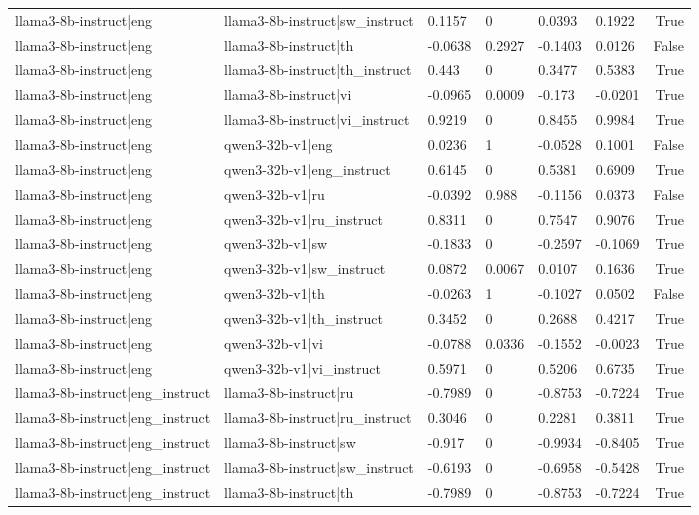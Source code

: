 \begin{table}
\begin{tabular}{llllllr}
llama3-8b-instruct|eng & llama3-8b-instruct|sw_instruct & 0.1157 & 0 & 0.0393 & 0.1922 & True \\
llama3-8b-instruct|eng & llama3-8b-instruct|th & -0.0638 & 0.2927 & -0.1403 & 0.0126 & False \\
llama3-8b-instruct|eng & llama3-8b-instruct|th_instruct & 0.443 & 0 & 0.3477 & 0.5383 & True \\
llama3-8b-instruct|eng & llama3-8b-instruct|vi & -0.0965 & 0.0009 & -0.173 & -0.0201 & True \\
llama3-8b-instruct|eng & llama3-8b-instruct|vi_instruct & 0.9219 & 0 & 0.8455 & 0.9984 & True \\
llama3-8b-instruct|eng & qwen3-32b-v1|eng & 0.0236 & 1 & -0.0528 & 0.1001 & False \\
llama3-8b-instruct|eng & qwen3-32b-v1|eng_instruct & 0.6145 & 0 & 0.5381 & 0.6909 & True \\
llama3-8b-instruct|eng & qwen3-32b-v1|ru & -0.0392 & 0.988 & -0.1156 & 0.0373 & False \\
llama3-8b-instruct|eng & qwen3-32b-v1|ru_instruct & 0.8311 & 0 & 0.7547 & 0.9076 & True \\
llama3-8b-instruct|eng & qwen3-32b-v1|sw & -0.1833 & 0 & -0.2597 & -0.1069 & True \\
llama3-8b-instruct|eng & qwen3-32b-v1|sw_instruct & 0.0872 & 0.0067 & 0.0107 & 0.1636 & True \\
llama3-8b-instruct|eng & qwen3-32b-v1|th & -0.0263 & 1 & -0.1027 & 0.0502 & False \\
llama3-8b-instruct|eng & qwen3-32b-v1|th_instruct & 0.3452 & 0 & 0.2688 & 0.4217 & True \\
llama3-8b-instruct|eng & qwen3-32b-v1|vi & -0.0788 & 0.0336 & -0.1552 & -0.0023 & True \\
llama3-8b-instruct|eng & qwen3-32b-v1|vi_instruct & 0.5971 & 0 & 0.5206 & 0.6735 & True \\
llama3-8b-instruct|eng_instruct & llama3-8b-instruct|ru & -0.7989 & 0 & -0.8753 & -0.7224 & True \\
llama3-8b-instruct|eng_instruct & llama3-8b-instruct|ru_instruct & 0.3046 & 0 & 0.2281 & 0.3811 & True \\
llama3-8b-instruct|eng_instruct & llama3-8b-instruct|sw & -0.917 & 0 & -0.9934 & -0.8405 & True \\
llama3-8b-instruct|eng_instruct & llama3-8b-instruct|sw_instruct & -0.6193 & 0 & -0.6958 & -0.5428 & True \\
llama3-8b-instruct|eng_instruct & llama3-8b-instruct|th & -0.7989 & 0 & -0.8753 & -0.7224 & True \\

\end{tabular}
\end{table}
